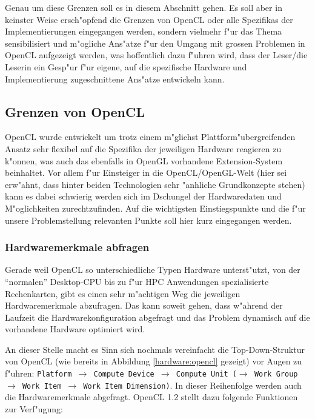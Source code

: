 \begin{refsection}
Genau um diese Grenzen soll es in diesem Abschnitt gehen. Es soll aber in keinster
Weise ersch"opfend die Grenzen von OpenCL oder alle Spezifikas der 
Implementierungen eingegangen werden, sondern vielmehr f"ur das Thema sensibilisiert 
und m"ogliche Ans"atze f"ur den Umgang mit grossen Problemen in OpenCL aufgezeigt
werden, was hoffentlich dazu f"uhren wird, dass der Leser/die Leserin ein Gesp"ur 
f"ur eigene, auf die spezifische Hardware und Implementierung zugeschnittene 
Ans"atze entwickeln kann.


\subsection{Grenzen von OpenCL}

OpenCL wurde entwickelt um trotz einem m"glichst Plattform"ubergreifenden Ansatz 
sehr flexibel auf die Spezifika der jeweiligen Hardware reagieren zu k"onnen, was
auch das ebenfalls in OpenGL vorhandene Extension-System beinhaltet. Vor allem f"ur
Einsteiger in die OpenCL/OpenGL-Welt (hier sei erw"ahnt, dass hinter beiden 
Technologien sehr "anhliche Grundkonzepte stehen) kann es dabei schwierig werden
sich im Dschungel der Hardwaredaten und M"oglichkeiten zurechtzufinden. Auf die 
wichtigsten Einstiegspunkte und die f"ur unsere Problemstellung relevanten Punkte
soll hier kurz eingegangen werden.


\subsubsection{Hardwaremerkmale abfragen}

Gerade weil OpenCL so unterschiedliche Typen Hardware unterst"utzt, von der ``normalen''
Desktop-CPU bis zu f"ur HPC Anwendungen spezialisierte Rechenkarten, gibt es einen
sehr m"achtigen Weg die jeweiligen Hardwaremerkmale abzufragen. Das kann soweit 
gehen, dass w"ahrend der Laufzeit die Hardwarekonfiguration abgefragt und das 
Problem dynamisch auf die vorhandene Hardware optimiert wird.

An dieser Stelle macht es Sinn sich nochmals vereinfacht die Top-Down-Struktur
von OpenCL (wie bereits in Abbildung \ref{hardware:opencl} gezeigt) vor Augen zu
f"uhren: \texttt{Platform $\rightarrow$ Compute Device $\rightarrow$ Compute
	Unit ($\rightarrow$ Work Group $\rightarrow$ Work Item $\rightarrow$ Work Item
Dimension)}. In dieser Reihenfolge werden auch die Hardwaremerkmale abgefragt.
OpenCL 1.2 stellt dazu folgende Funktionen zur Verf"ugung:


\end{refsection}
